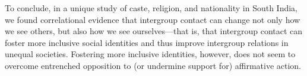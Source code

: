 \documentclass[12pt, a4paper]{article}
\begin{document}
To conclude, in a unique study of caste, religion, and nationality in South India, we found correlational evidence that intergroup contact can change not only how we see others, but also how we see ourselves---that is, that intergroup contact can foster more inclusive social identities and thus improve intergroup relations in unequal societies. Fostering more inclusive identities, however, does not seem to overcome entrenched opposition to (or undermine support for) affirmative action.

\nolinenumbers


\end{document}
